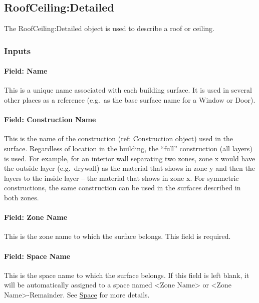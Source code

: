 \subsection{RoofCeiling:Detailed}\label{roofceilingdetailed}

The RoofCeiling:Detailed object is used to describe a roof or ceiling.

\subsubsection{Inputs}\label{inputs-21-007}

\paragraph{Field: Name}\label{field-name-17-008}

This is a unique name associated with each building surface. It is used in several other places as a reference (e.g.~as the base surface name for a Window or Door).

\paragraph{Field: Construction Name}\label{field-construction-name-17}

This is the name of the construction (ref: Construction object) used in the surface. Regardless of location in the building, the ``full'' construction (all layers) is used. For example, for an interior wall separating two zones, zone x would have the outside layer (e.g.~drywall) as the material that shows in zone y and then the layers to the inside layer -- the material that shows in zone x. For symmetric constructions, the same construction can be used in the surfaces described in both zones.

\paragraph{Field: Zone Name}\label{field-zone-name-11-000}

This is the zone name to which the surface belongs. This field is required.

\paragraph{Field: Space Name}\label{field-space-name-11-000}

This is the space name to which the surface belongs. If this field is left blank, it will be automatically assigned to a space named <Zone Name> or <Zone Name>-Remainder. See \hyperref[space]{Space} for more details.

